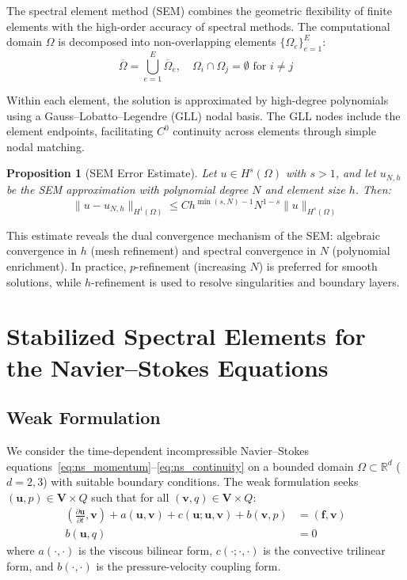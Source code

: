 \documentclass[12pt,a4paper,oneside]{report}
\newtheorem{proposition}[theorem]{Proposition}
\begin{document}
The spectral element method (SEM) combines the geometric flexibility of finite elements with the high-order accuracy of spectral methods. The computational domain $\Omega$ is decomposed into non-overlapping elements $\{\Omega_e\}_{e=1}^{E}$:
\begin{equation}
  \overline{\Omega} = \bigcup_{e=1}^{E} \overline{\Omega}_e, \quad \Omega_i \cap \Omega_j = \emptyset \text{ for } i \neq j
\end{equation}

Within each element, the solution is approximated by high-degree polynomials using a Gauss--Lobatto--Legendre (GLL) nodal basis. The GLL nodes include the element endpoints, facilitating $C^0$ continuity across elements through simple nodal matching.

\begin{proposition}[SEM Error Estimate]
Let $u \in H^s(\Omega)$ with $s > 1$, and let $u_{N,h}$ be the SEM approximation with polynomial degree $N$ and element size $h$. Then:
\begin{equation}
  \|u - u_{N,h}\|_{H^1(\Omega)} \leq C h^{\min(s,N)-1} N^{1-s} \|u\|_{H^s(\Omega)}
\end{equation}
\end{proposition}

This estimate reveals the dual convergence mechanism of the SEM: algebraic convergence in $h$ (mesh refinement) and spectral convergence in $N$ (polynomial enrichment). In practice, $p$-refinement (increasing $N$) is preferred for smooth solutions, while $h$-refinement is used to resolve singularities and boundary layers.

\chapter{Stabilized Spectral Elements for the Navier--Stokes Equations}
\label{ch:navier_stokes}

\section{Weak Formulation}

We consider the time-dependent incompressible Navier--Stokes equations~\eqref{eq:ns_momentum}--\eqref{eq:ns_continuity} on a bounded domain $\Omega \subset \mathbb{R}^d$ ($d = 2, 3$) with suitable boundary conditions. The weak formulation seeks $(\mathbf{u}, p) \in \mathbf{V} \times Q$ such that for all $(\mathbf{v}, q) \in \mathbf{V} \times Q$:
\begin{align}
  \left(\frac{\partial \mathbf{u}}{\partial t}, \mathbf{v}\right) + a(\mathbf{u}, \mathbf{v}) + c(\mathbf{u}; \mathbf{u}, \mathbf{v}) + b(\mathbf{v}, p) &= (\mathbf{f}, \mathbf{v}) \\
  b(\mathbf{u}, q) &= 0
\end{align}
where $a(\cdot,\cdot)$ is the viscous bilinear form, $c(\cdot;\cdot,\cdot)$ is the convective trilinear form, and $b(\cdot,\cdot)$ is the pressure-velocity coupling form.
\end{document}
